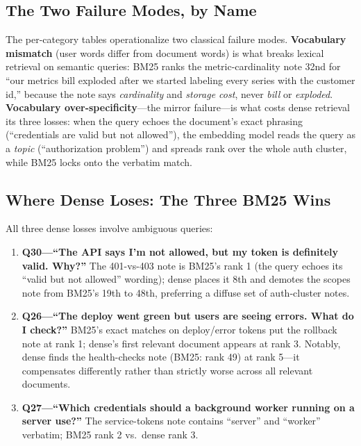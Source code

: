 \documentclass[11pt,a4paper]{article}
\begin{document}
\subsection{The Two Failure Modes, by Name}

The per-category tables operationalize two classical failure modes. \textbf{Vocabulary mismatch} (user words differ from document words) is what breaks lexical retrieval on semantic queries: BM25 ranks the metric-cardinality note 32nd for ``our metrics bill exploded after we started labeling every series with the customer id,'' because the note says \emph{cardinality} and \emph{storage cost}, never \emph{bill} or \emph{exploded}. \textbf{Vocabulary over-specificity}---the mirror failure---is what costs dense retrieval its three losses: when the query echoes the document's exact phrasing (``credentials are valid but not allowed''), the embedding model reads the query as a \emph{topic} (``authorization problem'') and spreads rank over the whole auth cluster, while BM25 locks onto the verbatim match.

\subsection{Where Dense Loses: The Three BM25 Wins}

All three dense losses involve ambiguous queries:

\begin{enumerate}[leftmargin=1.6em, itemsep=3pt]
    \item \textbf{Q30---``The API says I'm not allowed, but my token is definitely valid. Why?''} The 401-vs-403 note is BM25's rank 1 (the query echoes its ``valid but not allowed'' wording); dense places it 8th and demotes the scopes note from BM25's 19th to 48th, preferring a diffuse set of auth-cluster notes.
    \item \textbf{Q26---``The deploy went green but users are seeing errors. What do I check?''} BM25's exact matches on deploy/error tokens put the rollback note at rank 1; dense's first relevant document appears at rank 3. Notably, dense finds the health-checks note (BM25: rank 49) at rank 5---it compensates differently rather than strictly worse across all relevant documents.
    \item \textbf{Q27---``Which credentials should a background worker running on a server use?''} The service-tokens note contains ``server'' and ``worker'' verbatim; BM25 rank 2 vs.\ dense rank 3.
\end{enumerate}
\end{document}
